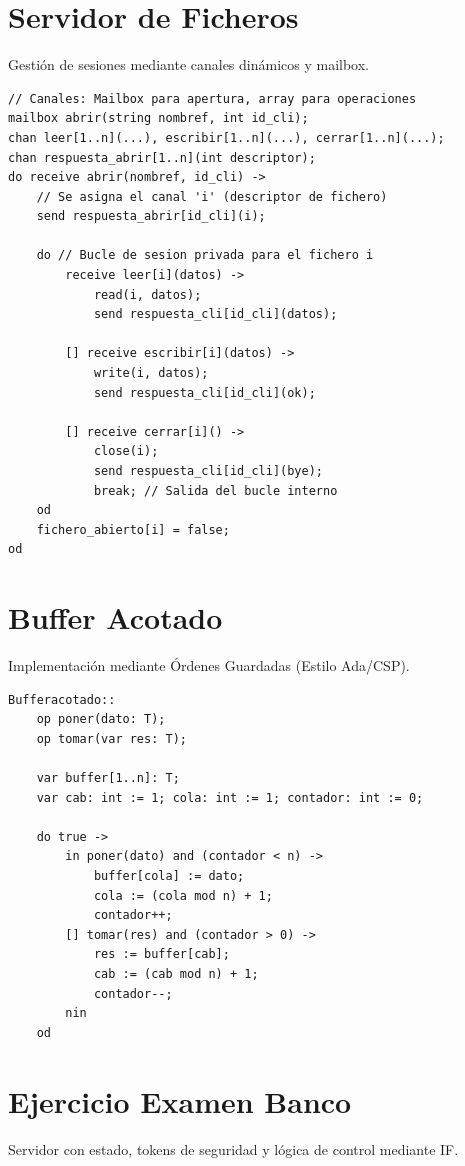 \section{Servidor de Ficheros}
Gestión de sesiones mediante canales dinámicos y mailbox.

\begin{lstlisting}[caption=Servidor de Ficheros]
// Canales: Mailbox para apertura, array para operaciones
mailbox abrir(string nombref, int id_cli);
chan leer[1..n](...), escribir[1..n](...), cerrar[1..n](...);
chan respuesta_abrir[1..n](int descriptor);
do receive abrir(nombref, id_cli) ->
    // Se asigna el canal 'i' (descriptor de fichero)
    send respuesta_abrir[id_cli](i); 
    
    do // Bucle de sesion privada para el fichero i
        receive leer[i](datos) -> 
            read(i, datos); 
            send respuesta_cli[id_cli](datos);
            
        [] receive escribir[i](datos) -> 
            write(i, datos);
            send respuesta_cli[id_cli](ok);
            
        [] receive cerrar[i]() -> 
            close(i);
            send respuesta_cli[id_cli](bye);
            break; // Salida del bucle interno
    od
    fichero_abierto[i] = false;
od
\end{lstlisting}

\section{Buffer Acotado}
Implementación mediante Órdenes Guardadas (Estilo Ada/CSP).

\begin{lstlisting}[caption=Buffer Acotado con Guardas]
Bufferacotado::
    op poner(dato: T);
    op tomar(var res: T);
    
    var buffer[1..n]: T;
    var cab: int := 1; cola: int := 1; contador: int := 0;

    do true ->
        in poner(dato) and (contador < n) ->
            buffer[cola] := dato;
            cola := (cola mod n) + 1;
            contador++;
        [] tomar(res) and (contador > 0) ->
            res := buffer[cab];
            cab := (cab mod n) + 1;
            contador--;
        nin
    od
\end{lstlisting}

\section{Ejercicio Examen Banco}
Servidor con estado, tokens de seguridad y lógica de control mediante IF.

